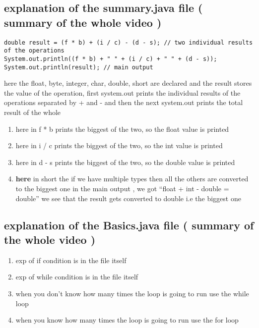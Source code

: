 \documentclass[11pt]{article}
\begin{document}
\subsection{explanation of the summary.java file ( summary of the whole video )}
\label{sec:org4c8c641}
\begin{verbatim}
double result = (f * b) + (i / c) - (d - s); // two individual results of the operations
System.out.println((f * b) + " " + (i / c) + " " + (d - s));
System.out.println(result); // main output
\end{verbatim}
here the float, byte, integer, char, double, short are declared and the result stores the value of the operation, first system.out prints the individual results of the operations separated by + and - and then the next system.out prints the total result of the whole
\begin{enumerate}
\item here in f * b prints the biggest of the two, so the float value is printed
\item here in i / c prints the biggest of the two, so the int value is printed
\item here in d - s prints the biggest of the two, so the double value is printed
\item \textbf{here} in short the if we have multiple types then all the others are converted to the biggest one
in the main output , we got ``float + int - double = double'' we see that the result gets converted to double i.e the biggest one
\end{enumerate}

\subsection{explanation of the Basics.java file ( summary of the whole video )}
\label{sec:org2d4cbd9}
\begin{enumerate}
\item exp of if condition is in the file itself
\item exp of while condition is in the file itself
\item when you don't know how many times the loop is going to run use the while loop
\item when you know how many times the loop is going to run use the for loop
\end{enumerate}
\end{document}
